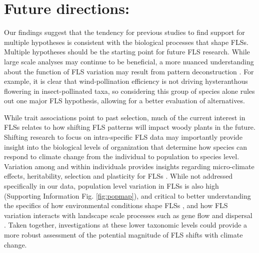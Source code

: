 \documentclass[11pt]{article}
\begin{document}
\section*{Future directions:}
\noindent Our findings suggest that the tendency for previous studies to find support for multiple hypotheses \citep{Bolmgren2003,Gougherty2018,Savage2019} is consistent with the biological processes that shape FLSs. Multiple hypotheses should be the starting point for future FLS research. While large scale analyses may continue to be beneficial, a more nuanced understanding about the function of FLS variation may result from pattern deconstruction \citep[i.e. grouping of species according to sub-clades or trait commonalities,][]{Terribile2009}. For example, it is clear that wind-pollination efficiency is not driving hysteranthous flowering in insect-pollinated taxa, so considering this group of species alone rules out one major FLS hypothesis, allowing for a better evaluation of alternatives. 


\noindent While trait associations point to past selection, much of the current interest in FLSs relates to how shifting FLS patterns will impact woody plants in the future. Shifting research to focus on intra-specific FLS data may importantly provide insight into the biological levels of organization that determine how species can respond to climate change from the individual to population to species level. Variation among and within individuals provides insights regarding  micro-climate effects, heritability, selection and plasticity for FLSs \citep{Denechere2019}.  While not addressed specifically in our data, population level variation in FLSs is also high (Supporting Information Fig. \ref{fig:popmap}), and critical to better understanding the specifics of how environmental conditions shape FLSs \citep{Vitasse2009}, and how FLS variation interacts with landscape scale processes such as gene flow and dispersal \citep{Manel2003}. Taken together, investigations at these lower taxonomic levels could provide a more robust assessment of the potential magnitude of FLS shifts with climate change.\\
\end{document}
